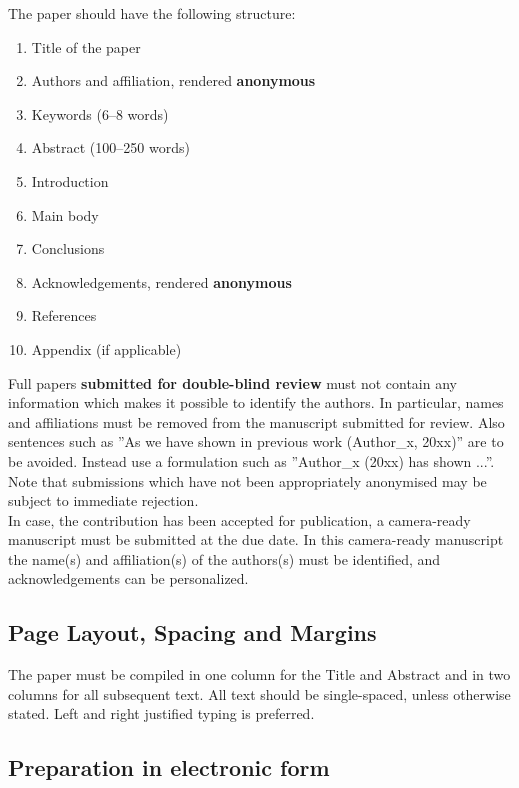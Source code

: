 \documentclass{isprs} %
\begin{document}
The paper should have the following structure: 

\begin{enumerate}
\setlength\itemsep{0em}\setlength\parskip{0em}\setlength\topsep{0em}\setlength\partopsep{0em}\setlength\parsep{0em} 
\item{Title of the paper} 
\item{Authors and affiliation, rendered \textbf{anonymous} }
\item{Keywords (6--8 words)}
\item{Abstract (100--250 words)}
\item{Introduction}
\item{Main body}
\item{Conclusions}
\item{Acknowledgements, rendered \textbf{anonymous}}
\item{References}
\item{Appendix (if applicable)}
\end{enumerate}

Full papers \textbf{submitted for double-blind review} must not contain any information which makes it possible to identify the authors. In particular, names and affiliations must be removed from the manuscript submitted for review. Also sentences such as ''As we have shown in previous work (Author\_x, 20xx)'' are to be avoided. Instead use a formulation such as ''Author\_x (20xx) has shown ...''. Note that submissions which have not been appropriately anonymised may be subject to immediate rejection.\\
In case, the contribution has been accepted for publication, a camera-ready manuscript must be submitted at the due date. In this camera-ready manuscript the name(s) and affiliation(s) of the authors(s) must be identified, and acknowledgements can be personalized.
\subsection{Page Layout, Spacing and Margins}\label{sec:Page Layout, Spacing and Margins}

The paper must be compiled in one column for the Title and Abstract and in two columns for all subsequent text. All text should be single-spaced, unless otherwise stated. Left and right justified typing is preferred.


\subsection{Preparation in electronic form}\label{sec:Preparation in electronic form}
\end{document}
